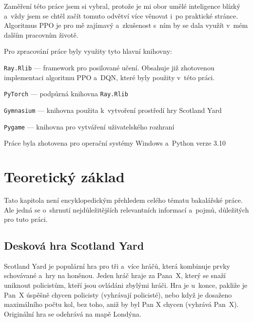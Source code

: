 Zaměření této práce jsem si vybral, protože je mi obor umělé inteligence blízký a~vždy jsem se chtěl začít tomuto odvětví více věnovat i~po praktické stránce.
Algoritmus PPO je pro mě zajímavý a~zkušenost s~ním by se dala využít v~mém dalším pracovním životě.\newpage

Pro zpracování práce byly využity tyto hlavní knihovny:
\begin{myitemize}
  \item \texttt{Ray.Rlib} --- framework pro posilované učení.
  Obsahuje již zhotovenou implementaci algoritmu PPO a~DQN, které byly použity v~této práci.

  \item \texttt{PyTorch} --- podpůrná knihovna \texttt{Ray.Rlib}
  \item \texttt{Gymnasium} --- knihovna použita k~vytvoření prostředí hry Scotland Yard
  \item \texttt{Pygame} --- knihovna pro vytváření uživatelského rozhraní
\end{myitemize}

Práce byla zhotovena pro operační systémy Windows a~Python verze 3.10

\chapter{Teoretický základ}
\label{ch:teoreticky_zaklad}
Tato kapitola není encyklopedickým přehledem celého tématu bakalářské práce.
Ale jedná se o~shrnutí nejdůležitějších relevantních informací a~pojmů, důležitých pro tuto práci.

\section{Desková hra Scotland Yard}
\label{sec:deskova-hra-scotland-yard}

Scotland Yard je populární hra pro tři a~více hráčů, která kombinuje prvky schovávané a~hry na honěnou.
Jeden hráč hraje za Pana~X, který se snaží uniknout policistům, kteří jsou ovládáni zbylými hráči.
Hra je u~konce, pakliže je Pan~X úspěšně chycen policisty (vyhrávají policisté), nebo když je dosaženo maximálního počtu kol, bez toho, aniž by byl Pan X chycen (vyhrává Pan~X).
Originální hra se odehrává na mapě Londýna.

